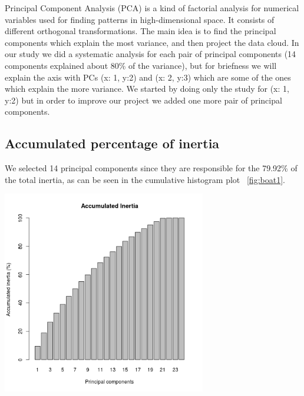 
Principal Component Analysis (PCA) is a kind of factorial analysis for numerical variables used for finding patterns in high-dimensional space. It consists of different orthogonal transformations. The main idea is to find the principal components which explain the most variance, and then project the data cloud. In our study we did a systematic analysis for each pair of principal components (14 components explained about 80\% of the variance), but for briefness we will explain the axis with PCs (x: 1, y:2) and (x: 2, y:3) which are some of the ones which explain the more variance. We started by doing only the study for (x: 1, y:2) but in order to improve our project we added one more pair of principal components.
\subsection{Accumulated percentage of inertia}

We selected 14 principal components since they are responsible for the 79.92\% of the total inertia, as can be seen in the cumulative histogram plot ~\ref{fig:boat1}.

\begin{center}
\includegraphics[width=3.5in]{images/ACP/a-cummulated-inertia-barplot.png}
\label{fig:boat1}
\end{center}

